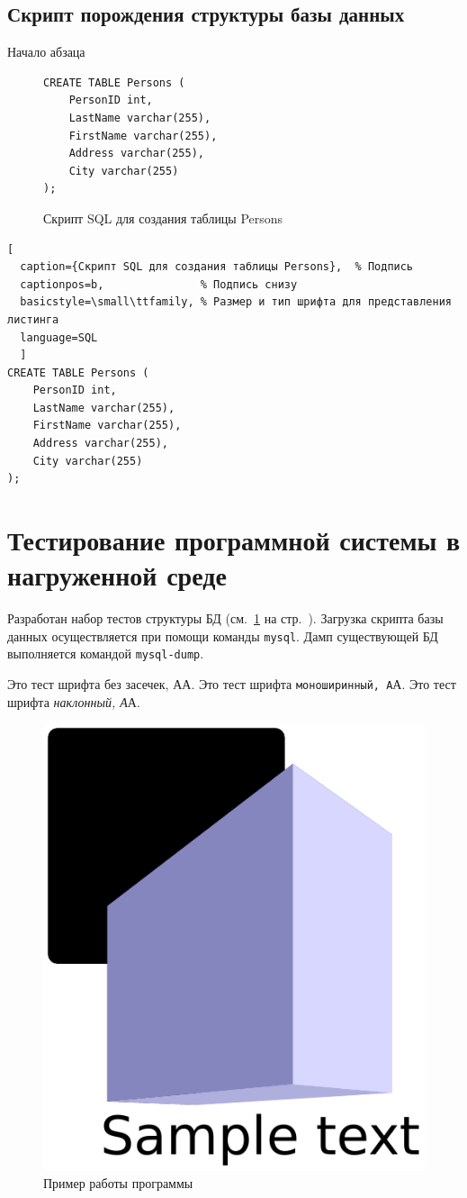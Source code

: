 \documentclass{studrep}
\begin{document}
\section{Скрипт порождения структуры базы данных}
\label{sec:struct-bd}

Начало абзаца


\begin{figure}[htbp]
\begin{center}
\begin{verbatim}
CREATE TABLE Persons (
    PersonID int,
    LastName varchar(255),
    FirstName varchar(255),
    Address varchar(255),
    City varchar(255)
);
\end{verbatim}
\end{center}
\caption{Скрипт SQL для создания таблицы Persons}\label{fig:create-table}
\end{figure}

\begin{lstlisting}[
  caption={Скрипт SQL для создания таблицы Persons},  % Подпись
  captionpos=b,               % Подпись снизу
  basicstyle=\small\ttfamily, % Размер и тип шрифта для представления листинга
  language=SQL
  ]
CREATE TABLE Persons (
    PersonID int,
    LastName varchar(255),
    FirstName varchar(255),
    Address varchar(255),
    City varchar(255)
);
\end{lstlisting}


\chapter{Тестирование программной системы в нагруженной среде}

Разработан набор тестов структуры БД (см.~\ref{sec:struct-bd} на стр.~\pageref{sec:struct-bd}).   Загрузка скрипта базы данных осуществляется при помощи команды \texttt{mysql}.  Дамп существующей БД выполняется командой \verb|mysql-dump|.

Это тест шрифта \textsf{без засечек, А}А.
Это тест шрифта \texttt{моноширинный, А}А.
Это тест шрифта \textit{наклонный, А}А.

\begin{figure}[hbtp]
  \centering
  \includegraphics[width=0.3\linewidth]{fig1.pdf}
  \caption{Пример работы программы}
  \label{fig:prog-ex}
\end{figure}
\end{document}
